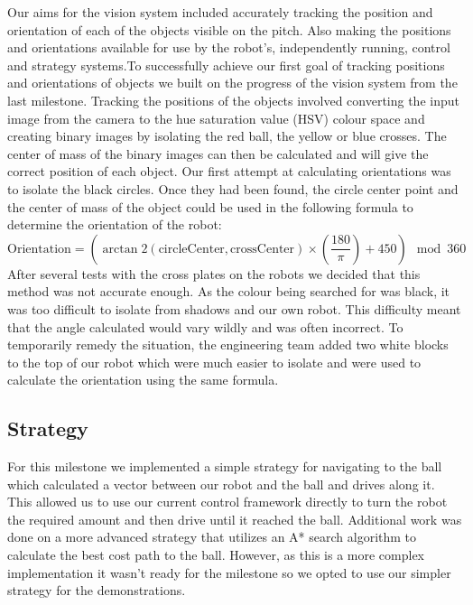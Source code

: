\documentclass[12pt, a4paper, titlepage]{article}
\begin{document}
Our aims for the vision system included accurately tracking the position and
orientation of each of the objects visible on the pitch. Also making the
positions and orientations available for use by the robot’s, independently
running, control and strategy systems.To successfully achieve our first goal of
tracking positions and orientations of objects we built on the progress of the
vision system from the last milestone. Tracking the positions of the objects
involved converting the input image from the camera to the hue saturation value
(HSV) colour space and creating binary images by isolating the red ball, the
yellow or blue crosses. The center of mass of the binary images can then be
calculated and will give the correct position of each object. Our first attempt
at calculating orientations was to isolate the black circles. Once they had been
found, the circle center point and the center of mass of the object could be
used in the following formula to determine the orientation of the robot:
\begin{equation*}
\mbox{Orientation} = (\arctan2(\mbox{circleCenter}, \mbox{crossCenter}) \times \left(\frac{180}{\pi}\right) + 450) \mod 360
\end{equation*}
After several tests with the cross plates on the robots we decided that this
method was not accurate enough. As the colour being searched for was black, it
was too difficult to isolate from shadows and our own robot. This difficulty
meant that the angle calculated would vary wildly and was often incorrect. To
temporarily remedy the situation, the engineering team added two white blocks
to the top of our robot which were much easier to isolate and were used to
calculate the orientation using the same formula.

\subsection{Strategy}

For this milestone we implemented a simple strategy for navigating to the ball
which calculated a vector between our robot and the ball and drives along it.
This allowed us to use our current control framework directly to turn the robot
the required amount and then drive until it reached the ball. Additional work
was done on a more advanced strategy that utilizes an A* search algorithm to
calculate the best cost path to the ball. However, as this is a more complex
implementation it wasn’t ready for the milestone so we opted to use our
simpler strategy for the demonstrations.
\end{document}
